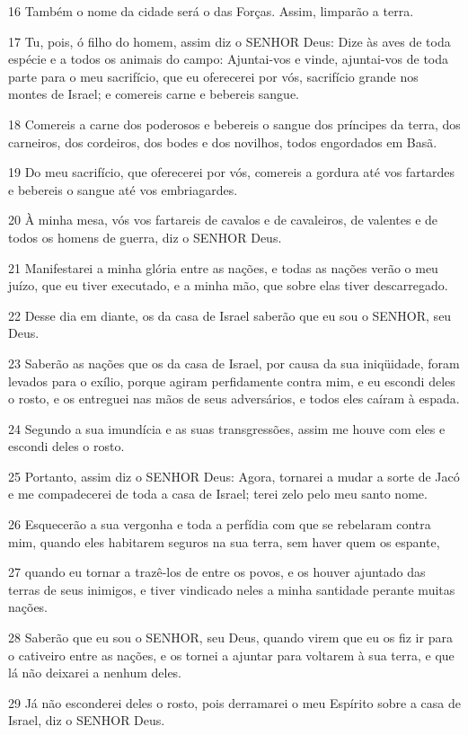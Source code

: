 \par 16 Também o nome da cidade será o das Forças. Assim, limparão a terra.
\par 17 Tu, pois, ó filho do homem, assim diz o SENHOR Deus: Dize às aves de toda espécie e a todos os animais do campo: Ajuntai-vos e vinde, ajuntai-vos de toda parte para o meu sacrifício, que eu oferecerei por vós, sacrifício grande nos montes de Israel; e comereis carne e bebereis sangue.
\par 18 Comereis a carne dos poderosos e bebereis o sangue dos príncipes da terra, dos carneiros, dos cordeiros, dos bodes e dos novilhos, todos engordados em Basã.
\par 19 Do meu sacrifício, que oferecerei por vós, comereis a gordura até vos fartardes e bebereis o sangue até vos embriagardes.
\par 20 À minha mesa, vós vos fartareis de cavalos e de cavaleiros, de valentes e de todos os homens de guerra, diz o SENHOR Deus.
\par 21 Manifestarei a minha glória entre as nações, e todas as nações verão o meu juízo, que eu tiver executado, e a minha mão, que sobre elas tiver descarregado.
\par 22 Desse dia em diante, os da casa de Israel saberão que eu sou o SENHOR, seu Deus.
\par 23 Saberão as nações que os da casa de Israel, por causa da sua iniqüidade, foram levados para o exílio, porque agiram perfidamente contra mim, e eu escondi deles o rosto, e os entreguei nas mãos de seus adversários, e todos eles caíram à espada.
\par 24 Segundo a sua imundícia e as suas transgressões, assim me houve com eles e escondi deles o rosto.
\par 25 Portanto, assim diz o SENHOR Deus: Agora, tornarei a mudar a sorte de Jacó e me compadecerei de toda a casa de Israel; terei zelo pelo meu santo nome.
\par 26 Esquecerão a sua vergonha e toda a perfídia com que se rebelaram contra mim, quando eles habitarem seguros na sua terra, sem haver quem os espante,
\par 27 quando eu tornar a trazê-los de entre os povos, e os houver ajuntado das terras de seus inimigos, e tiver vindicado neles a minha santidade perante muitas nações.
\par 28 Saberão que eu sou o SENHOR, seu Deus, quando virem que eu os fiz ir para o cativeiro entre as nações, e os tornei a ajuntar para voltarem à sua terra, e que lá não deixarei a nenhum deles.
\par 29 Já não esconderei deles o rosto, pois derramarei o meu Espírito sobre a casa de Israel, diz o SENHOR Deus.

